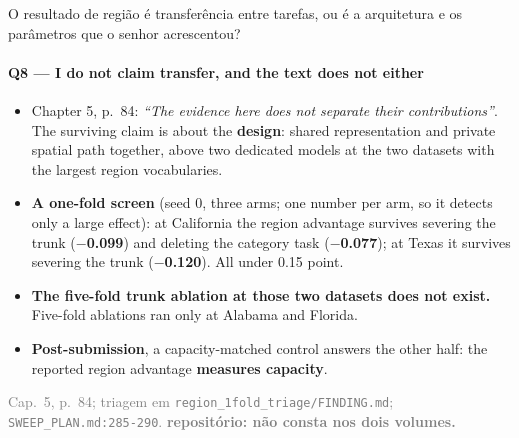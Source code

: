 \documentclass{beamer}
\begin{document}
\begin{frame}[noframenumbering]{O resultado de região é transferência entre tarefas, ou é a arquitetura e os parâmetros que o senhor acrescentou?}
    \framesubtitle{Q8 --- I do not claim transfer, and the text does not either}
    \hypertarget{q8}{}
    \small\begin{itemize}\setlength{\itemsep}{0pt}\setlength{\parskip}{0pt}
        \item Chapter 5, p.~84: \textit{``The evidence here does not separate their contributions''}. The surviving claim is about the \textbf{design}: shared representation and private spatial path together, above two dedicated models at the two datasets with the largest region vocabularies.
        \item \textbf{A one-fold screen} (seed 0, three arms; one number per arm, so it detects only a large effect): at California the region advantage survives severing the trunk (\textbf{$-$0.099}) and deleting the category task (\textbf{$-$0.077}); at Texas it survives severing the trunk (\textbf{$-$0.120}). All under 0.15 point.
        \item \textcolor{alert}{\textbf{The five-fold trunk ablation at those two datasets does not exist.}} Five-fold ablations ran only at Alabama and Florida.
        \item \textbf{Post-submission}, a capacity-matched control answers the other half: the reported region advantage \textbf{measures capacity}.
    \end{itemize}
    \vfill
    {\scriptsize
    \begin{minipage}[b]{0.775\linewidth}\raggedright\textcolor{gray}{Cap.~5, p.~84; triagem em \texttt{region\_1fold\_triage/FINDING.md}; \texttt{SWEEP\_PLAN.md:285-290}. \textbf{repositório: não consta nos dois volumes.}}\end{minipage}\hfill
    \begin{minipage}[b]{0.20\linewidth}\raggedleft \hyperlink{bp1}{}\hyperlink{b0}{}\end{minipage}}
\end{frame}
\end{document}
